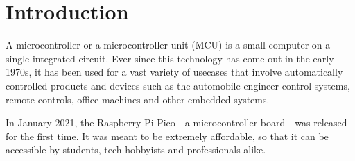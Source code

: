 \documentclass[12pt]{report}
\begin{document}
\begin{abstract}
Many edge devices such as the Raspberry Pi Pico house a powerful Micro Controller Unit (MCU), with multiple cores. In the case of Raspberry Pi Pico, it houses two powerful ARM Cortex-M0+ cores giving it a lot of resources to work with, but the traditional approach for usage restricts full efficient use of these cores, limiting it to only a single program to be flashed and run on the device at any instance. The objective is to solve this by providing the user with an Operating System (OS) capable of handling multiple tasks.
\end{abstract}

\pagebreak

\tableofcontents

\pagebreak

\chapter{Introduction}
A microcontroller or a microcontroller unit (MCU) is a small computer on a single integrated circuit.
Ever since this technology has come out in the early 1970s,
it has been used for a vast variety of usecases that involve
automatically controlled products and devices such as the 
automobile engineer control systems, remote controls, office
machines and other embedded systems.\par

In January 2021, the Raspberry Pi Pico - a microcontroller board - was
released for the first time. It was meant to be extremely affordable, so
that it can be accessible by students, tech hobbyists and professionals alike.
\end{document}
